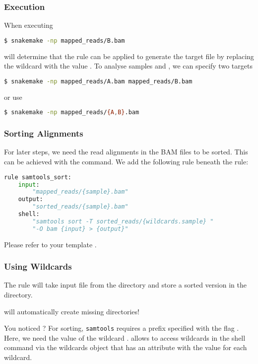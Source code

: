 \begin{frame}[fragile]
  \frametitle{Execution}
  When executing
  \begin{lstlisting}[language=Bash, style=Shell]
$ snakemake -np mapped_reads/B.bam
  \end{lstlisting}
  \Snakemake{} will determine that the rule  can be applied to generate the target file by replacing the wildcard  with the value .\newline
  To analyse samples  and , we can specify two targets
    \begin{lstlisting}[language=Bash, style=Shell]
$ snakemake -np mapped_reads/A.bam mapped_reads/B.bam
  \end{lstlisting}
  or use 
  \begin{lstlisting}[language=Bash, style=Shell]
$ snakemake -np mapped_reads/{A,B}.bam
  \end{lstlisting}
\end{frame}

\begin{frame}[fragile]
  \frametitle{Sorting Alignments}
  For later steps, we need the read alignments in the BAM files to be sorted. This can be achieved with the   command. We add the following rule beneath the  rule:
  \begin{lstlisting}[language=Python,style=Python]
rule samtools_sort:
    input:
        "mapped_reads/{sample}.bam"
    output:
        "sorted_reads/{sample}.bam"
    shell:
        "samtools sort -T sorted_reads/{wildcards.sample} "
        "-O bam {input} > {output}"
  \end{lstlisting}
  \begin{task}
  	Please refer to your template .
  \end{task}
\end{frame}

\begin{frame}[fragile]
  \frametitle{Using Wildcards}
  The rule will take  input file from the  directory and store a sorted version in the  directory.
  \pause
  \begin{docs}
  	\Snakemake{} will automatically create missing directories!
  \end{docs}
  You noticed ?
  \pause
  For sorting, \texttt{samtools} requires a prefix specified with the flag . Here, we need the value of the wildcard . \Snakemake{} allows to access wildcards in the shell command via the wildcards object that has an attribute with the value for each wildcard.
\end{frame}

